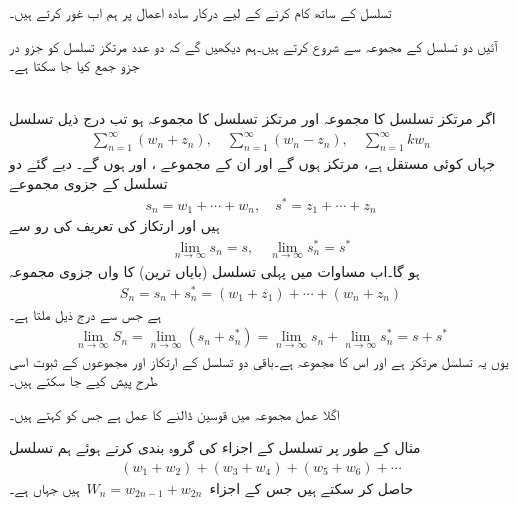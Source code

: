 تسلسل کے ساتھ کام کرنے کے لیے درکار سادہ اعمال پر ہم اب غور کرتے ہیں۔

آئیں دو تسلسل کے مجموعہ سے شروع کرتے ہیں۔ہم دیکھیں گے کہ دو عدد مرتکز تسلسل کو جزو در جزو جمع کیا جا سکتا ہے۔

\quad{}\quad {}\\
اگر مرتکز تسلسل  کا مجموعہ  اور مرتکز تسلسل  کا مجموعہ  ہو تب درج ذیل تسلسل
\begin{align}\label{مساوات_ترتیب_اعمال_الف}
\sum\limits_{n=1}^{\infty} (w_n+z_n), \quad \sum\limits_{n=1}^{\infty} (w_n-z_n), \quad \sum\limits_{n=1}^{\infty} kw_n
\end{align}
جہاں  کوئی مستقل ہے، مرتکز ہوں گے اور ان کے مجموعے ،  اور  ہوں گے۔ 
\quad
دیے گئے دو تسلسل کے جزوی مجموعے
\begin{align*}
s_n=w_1+\cdots+w_n,\quad s^*=z_1+\cdots+z_n
\end{align*}
ہیں اور ارتکاز کی تعریف کی رو سے
\begin{align*}
\lim_{n\to \infty} s_n=s,\quad \lim_{n\to \infty} s^*_n=s^*
\end{align*}
ہو گا۔اب مساوات  میں   پہلی تسلسل (بایاں ترین) کا  واں جزوی مجموعہ 
\begin{align*}
S_n=s_n+s^*_n=(w_1+z_1)+\cdots+(w_n+z_n)
\end{align*}
ہے جس سے درج ذیل ملتا ہے۔
\begin{align*}
\lim_{n\to\infty}S_n=\lim_{n\to \infty} (s_n+s^*_n)=\lim_{n\to\infty} s_n+\lim_{n\to\infty} s^*_n=s+s^*
\end{align*}
یوں یہ تسلسل مرتکز ہے اور اس کا مجموعہ  ہے۔باقی دو تسلسل کے ارتکاز اور مجموعوں کے ثبوت اسی طرح پیش کیے جا سکتے ہیں۔

اگلا عمل مجموعہ میں قوسین ڈالنے کا عمل ہے جس کو  کہتے ہیں۔ 

مثال کے طور پر تسلسل  کے اجزاء کی گروہ بندی کرتے ہوئے ہم تسلسل
\begin{align*}
(w_1+w_2)+(w_3+w_4)+(w_5+w_6)+\cdots
\end{align*}
حاصل کر سکتے ہیں جس کے اجزاء 
$\,W_n=w_{2n-1}+w_{2n}\,$
ہیں جہاں  ہے۔

